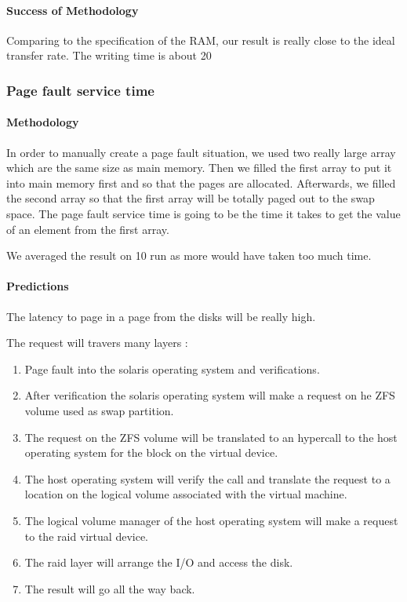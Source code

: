 \paragraph{Success of Methodology}
Comparing to the specification of the RAM, our result is really close to the ideal transfer rate. The writing time is about 20%



\subsubsection{Page fault service time}
\paragraph{Methodology}
In order to manually create a page fault situation, we used two really large array which are the same size as main memory.
Then we filled the first array to put it into main memory first and so that the pages are allocated.
Afterwards, we filled the second array so that the first array will be totally paged out to the swap space.
The page fault service time is going to be the time it takes to get the value of an element from the first array.

We averaged the result on 10 run as more would have taken too much time.

\paragraph{Predictions}
The latency to page in a page from the disks will be really high.

The request will travers many layers :
\begin{enumerate}
\item Page fault into the solaris operating system and verifications.
\item After verification the solaris operating system will make a request on
he ZFS volume used as swap partition.
\item The request on the ZFS volume will be translated to an hypercall to the
host operating system for the block on the virtual device.
\item The host operating system will verify the call and translate the request
to a location on the logical volume associated with the virtual machine.
\item The logical volume manager of the host operating system will make a
request to the raid virtual device.
\item The raid layer will arrange the I/O and access the disk.
\item The result will go all the way back.
\end{enumerate}

